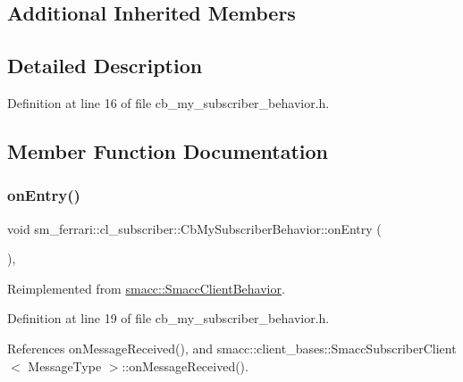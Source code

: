 \subsection*{Additional Inherited Members}


\subsection{Detailed Description}


Definition at line 16 of file cb\+\_\+my\+\_\+subscriber\+\_\+behavior.\+h.



\subsection{Member Function Documentation}
\mbox{\label{classsm__ferrari_1_1cl__subscriber_1_1CbMySubscriberBehavior_a16c8c5e65f02bd76081c3dc13367776a}} 
\subsubsection{\texorpdfstring{on\+Entry()}{onEntry()}}
{\footnotesize\ttfamily void sm\+\_\+ferrari\+::cl\+\_\+subscriber\+::\+Cb\+My\+Subscriber\+Behavior\+::on\+Entry (\begin{DoxyParamCaption}{ }\end{DoxyParamCaption})\hspace{0.3cm}{\ttfamily [inline]}, {\ttfamily [virtual]}}



Reimplemented from \hyperlink{classsmacc_1_1SmaccClientBehavior_ad5d3e1f1697c3cfe66c94cadba948493}{smacc\+::\+Smacc\+Client\+Behavior}.



Definition at line 19 of file cb\+\_\+my\+\_\+subscriber\+\_\+behavior.\+h.



References on\+Message\+Received(), and smacc\+::client\+\_\+bases\+::\+Smacc\+Subscriber\+Client$<$ Message\+Type $>$\+::on\+Message\+Received().


